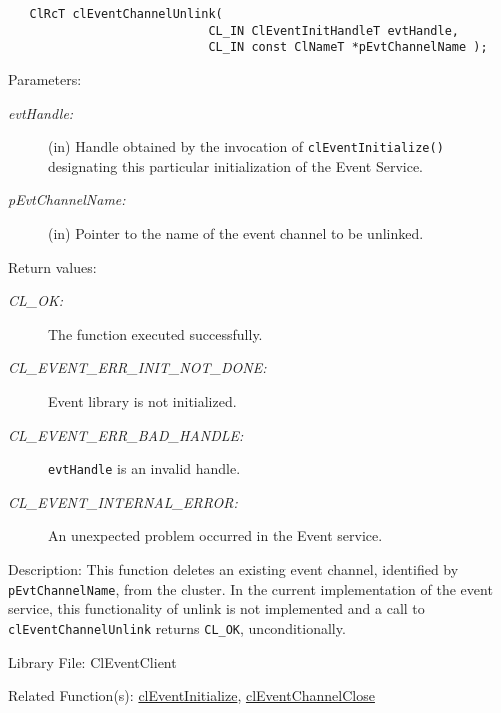 \begin{flushleft}
\begin{Desc}
\footnotesize\begin{verbatim}   ClRcT clEventChannelUnlink(
              				CL_IN ClEventInitHandleT evtHandle,
              				CL_IN const ClNameT *pEvtChannelName );
\end{verbatim}
\normalsize
\end{Desc}
\begin{Desc}
\item[Parameters:]
\begin{description}
\item[{\em evt\-Handle:}](in) Handle obtained by the invocation of {\tt{clEventInitialize()}} designating this particular initialization of the Event 
Service. 
\item[{\em p\-Evt\-Channel\-Name:}](in) Pointer to the name of the event channel to be unlinked.\end{description}
\end{Desc}
\begin{Desc}
\item[Return values:]
\begin{description}
\item[{\em CL\_\-OK:}]The function executed successfully. 
\item[{\em CL\_\-EVENT\_\-ERR\_\-INIT\_\-NOT\_\-DONE:}]Event library is not initialized. 
\item[{\em CL\_\-EVENT\_\-ERR\_\-BAD\_\-HANDLE:}]{\tt{evtHandle}} is an invalid handle. 
\item[{\em CL\_\-EVENT\_\-INTERNAL\_\-ERROR:}]An unexpected problem occurred in the Event service.\end{description}
\end{Desc}
\begin{Desc}
\item[Description:]This function deletes an existing event channel, identified by {\tt{pEvtChannelName}}, from the cluster. In the current implementation 
of the event service, this functionality of unlink is not implemented and a call to {\tt{clEventChannelUnlink}} returns {\tt{CL\_\-OK}}, unconditionally.
\end{Desc}
\begin{Desc}
\item[Library File:]Cl\-Event\-Client\end{Desc}
\begin{Desc}
\item[Related Function(s):]\hyperlink{pageem101}{cl\-Event\-Initialize}, \hyperlink{pageem105}{cl\-Event\-Channel\-Close} \end{Desc}
\newpage




\end{flushleft}

